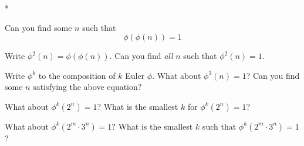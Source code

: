 *
\mbox{}
  \begin{myenum}
    \item
      Can you find some $n$ such that
      \[
      \phi(\phi(n)) = 1
      \]
    \item
      Write $\phi^2(n) = \phi(\phi(n))$.
      Can you find \textit{all} $n$ such that $\phi^2(n) = 1$.
    \item
      Write $\phi^k$ to the composition of $k$ Euler $\phi$.
      What about $\phi^3(n) = 1$?
      Can you find some $n$ satisfying the above equation?
    \item
      What about $\phi^k(2^n) = 1$? What is the smallest $k$
      for $\phi^k(2^n) = 1$?
    \item
      What about $\phi^k(2^m \cdot 3^n) = 1$? What is the smallest $k$
      such that $\phi^k(2^m \cdot 3^n) = 1$?
  \end{myenum}
